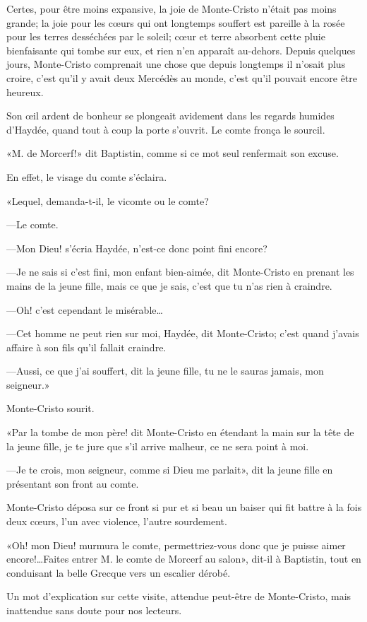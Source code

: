Certes, pour être moins expansive, la joie de Monte-Cristo n'était pas moins grande; la joie pour les cœurs qui ont longtemps souffert est pareille à la rosée pour les terres desséchées par le soleil; cœur et terre absorbent cette pluie bienfaisante qui tombe sur eux, et rien n'en apparaît au-dehors. Depuis quelques jours, Monte-Cristo comprenait une chose que depuis longtemps il n'osait plus croire, c'est qu'il y avait deux Mercédès au monde, c'est qu'il pouvait encore être heureux. 

Son œil ardent de bonheur se plongeait avidement dans les regards humides d'Haydée, quand tout à coup la porte s'ouvrit. Le comte fronça le sourcil. 

«M. de Morcerf!» dit Baptistin, comme si ce mot seul renfermait son excuse. 

En effet, le visage du comte s'éclaira. 

«Lequel, demanda-t-il, le vicomte ou le comte? 

—Le comte. 

—Mon Dieu! s'écria Haydée, n'est-ce donc point fini encore? 

—Je ne sais si c'est fini, mon enfant bien-aimée, dit Monte-Cristo en prenant les mains de la jeune fille, mais ce que je sais, c'est que tu n'as rien à craindre. 

—Oh! c'est cependant le misérable\dots 

—Cet homme ne peut rien sur moi, Haydée, dit Monte-Cristo; c'est quand j'avais affaire à son fils qu'il fallait craindre. 

—Aussi, ce que j'ai souffert, dit la jeune fille, tu ne le sauras jamais, mon seigneur.» 

Monte-Cristo sourit. 

«Par la tombe de mon père! dit Monte-Cristo en étendant la main sur la tête de la jeune fille, je te jure que s'il arrive malheur, ce ne sera point à moi. 

—Je te crois, mon seigneur, comme si Dieu me parlait», dit la jeune fille en présentant son front au comte. 

Monte-Cristo déposa sur ce front si pur et si beau un baiser qui fit battre à la fois deux cœurs, l'un avec violence, l'autre sourdement. 

«Oh! mon Dieu! murmura le comte, permettriez-vous donc que je puisse aimer encore!\dots Faites entrer M. le comte de Morcerf au salon», dit-il à Baptistin, tout en conduisant la belle Grecque vers un escalier dérobé. 

Un mot d'explication sur cette visite, attendue peut-être de Monte-Cristo, mais inattendue sans doute pour nos lecteurs. 

